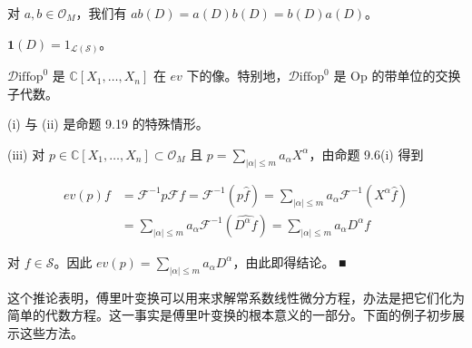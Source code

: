 \begin{corollary}

\begin{subitems}
\item

对 $ a, b \in \mathcal{O}_M $，我们有 $ ab(D) = a(D)b(D) = b(D)a(D) $。

\item

$ \mathbf{1}(D) = 1_{\mathcal{L}(\mathcal{S})} $。

\item

$ \mathcal{D}\mathrm{iffop}^0 $ 是 $ \mathbb{C}[X_1,\ldots,X_n] $ 在 $ ev $ 下的像。特别地，$ \mathcal{D}\mathrm{iffop}^0 $ 是 $ \mathrm{Op} $ 的带单位的交换子代数。

\proofhead
(i) 与 (ii) 是命题 9.19 的特殊情形。
\end{subitems}

(iii) 对 $ p \in \mathbb{C}[X_1,\ldots,X_n] \subset \mathcal{O}_M $ 且 $ p = \sum_{|\alpha| \le m} a_\alpha X^\alpha $，由命题 9.6(i) 得到

\begin{equation*}
\begin{aligned}
ev(p)f &= \mathcal{F}^{-1}p\mathcal{F}f = \mathcal{F}^{-1}(p\hat{f}) = \sum_{|\alpha| \le m} a_\alpha \mathcal{F}^{-1}(X^\alpha \hat{f}) \\ &= \sum_{|\alpha| \le m} a_\alpha \mathcal{F}^{-1}(\widehat{D^\alpha f}) = \sum_{|\alpha| \le m} a_\alpha D^\alpha f
\end{aligned}
\end{equation*}

对 $ f \in \mathcal{S} $。因此 $ ev(p) = \sum_{|\alpha| \le m} a_\alpha D^\alpha $，由此即得结论。 \nobreak\hspace{0.35em}■

\end{corollary}

这个推论表明，傅里叶变换可以用来求解常系数线性微分方程，办法是把它们化为简单的代数方程。这一事实是傅里叶变换的根本意义的一部分。下面的例子初步展示这些方法。

